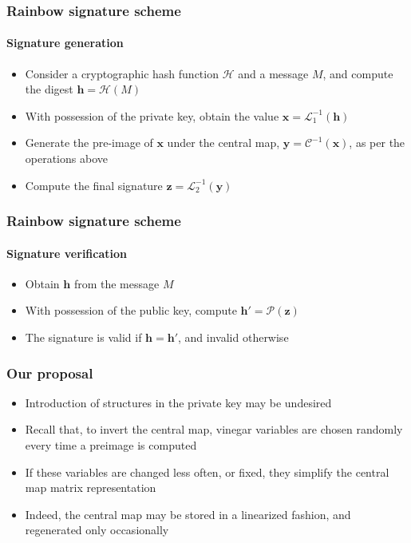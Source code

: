 \documentclass[12pt]{beamer}
\begin{document}
\begin{frame}
\begin{itemize}
\begin{figure}
    \end{figure}
  \end{itemize}
\end{frame}

\begin{frame}
  \frametitle{Rainbow signature scheme}
  \framesubtitle{Signature generation}
  \begin{itemize}
    \item Consider a cryptographic hash function $\mathcal{H}$ and a message
        $M$, and compute the digest $\mathbf{h} = \mathcal{H}(M)$
    \item With possession of the private key, obtain the value $\mathbf{x} =
        \mathcal{L}_{1}^{-1}(\mathbf{h})$
    \item Generate the pre-image of $\mathbf{x}$ under the central map,
        $\mathbf{y} = \mathcal{C}^{-1}(\mathbf{x})$, as per the operations
          above
    \item Compute the final signature
        $\mathbf{z} = \mathcal{L}_{2}^{-1}(\mathbf{y})$
  \end{itemize}
\end{frame}

\begin{frame}
  \frametitle{Rainbow signature scheme}
  \framesubtitle{Signature verification}
  \begin{itemize}
    \item Obtain $\mathbf{h}$ from the message $M$
    \item With possession of the public key, compute
        $\mathbf{h}' = \mathcal{P}(\mathbf{z})$
    \item The signature is valid if $\mathbf{h} = \mathbf{h}'$, and invalid
        otherwise
  \end{itemize}
\end{frame}

\begin{frame}
  \frametitle{Our proposal}
  \begin{itemize}
    \item Introduction of structures in the private key may be undesired
    \item Recall that, to invert the central map, vinegar variables are
        chosen randomly every time a preimage is computed
    \item If these variables are changed less often, or fixed, they simplify
        the central map matrix representation
    \item Indeed, the central map may be stored in a linearized fashion, and
        regenerated only occasionally
  \end{itemize}
\end{frame}
\end{document}
